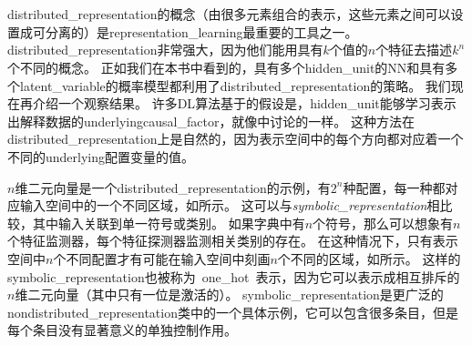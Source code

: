 \section{}
\label{sec:distributed_representation}

\gls{distributed_representation}的概念（由很多元素组合的表示，这些元素之间可以设置成可分离的）是\gls{representation_learning}最重要的工具之一。
\gls{distributed_representation}非常强大，因为他们能用具有$k$个值的$n$个特征去描述$k^n$个不同的概念。
正如我们在本书中看到的，具有多个\gls{hidden_unit}的\gls{NN}和具有多个\gls{latent_variable}的概率模型都利用了\gls{distributed_representation}的策略。
我们现在再介绍一个观察结果。
许多\gls{DL}算法基于的假设是，\gls{hidden_unit}能够学习表示出解释数据的\gls{underlying}\gls{causal_factor}，就像中讨论的一样。
这种方法在\gls{distributed_representation}上是自然的，因为表示空间中的每个方向都对应着一个不同的\gls{underlying}配置变量的值。


$n$维二元向量是一个\gls{distributed_representation}的示例，有$2^n$种配置，每一种都对应输入空间中的一个不同区域，如所示。
这可以与\emph{\gls{symbolic_representation}}相比较，其中输入关联到单一符号或类别。
如果字典中有$n$个符号，那么可以想象有$n$个特征监测器，每个特征探测器监测相关类别的存在。
在这种情况下，只有表示空间中$n$个不同配置才有可能在输入空间中刻画$n$个不同的区域，如所示。
这样的\gls{symbolic_representation}也被称为~\gls{one_hot}~表示，因为它可以表示成相互排斥的$n$维二元向量（其中只有一位是激活的）。
\gls{symbolic_representation}是更广泛的\gls{nondistributed_representation}类中的一个具体示例，它可以包含很多条目，但是每个条目没有显著意义的单独控制作用。



